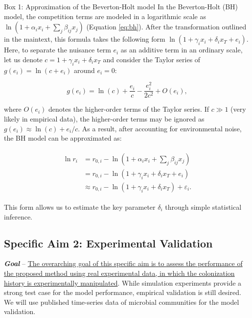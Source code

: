 \documentclass[12pt, class=article, crop=false]{standalone}
\begin{document}
\begin{tcolorbox}[{
  breakable,
  colback=white,
  colframe=gray,
  coltext=black,
  parbox=false,
  boxsep=5pt,
  arc=1pt}]
    Box 1: Approximation of the Beverton-Holt model
    \hline
    In the Beverton-Holt (BH) model, the competition terms are modeled in a logarithmic scale as $\ln(1 + \alpha_i x_i + \sum_j \beta_{ij} x_j)$ (Equation \ref{eq:bh}).
    After the transformation outlined in the maintext, this formula takes the following form $\ln(1 + \gamma_i x_i + \delta_i x_T + e_i)$.
    Here, to separate the nuisance term $e_i$ as an additive term in an ordinary scale, let us denote $c = 1 + \gamma_i x_i + \delta_i x_T$ and consider the Taylor series of $g(e_i) = \ln(c + e_i)$ around $e_i = 0$:

    \begin{equation}
        \label{eq:bhtaylor}
        g(e_i) = \ln(c) + \frac{e_i}{c} - \frac{e_i^2}{2 c^2} + O(e_i),
    \end{equation}

    where $O(e_i)$ denotes the higher-order terms of the Taylor series. If $c \gg 1$ (very likely in empirical data), the higher-order terms may be ignored as $g(e_i) \approx \ln(c) + e_i / c$.
    As a result, after accounting for environmental noise, the BH model can be approximated as:

    \begin{align}
    \begin{split}
        \ln r_i &= r_{0,i} - \ln(1 + \alpha_i x_i + \sum_j \beta_{ij} x_j)\\
                &= r_{0,i} - \ln(1 + \gamma_i x_i + \delta_{i} x_T + e_i)\\
                &\approx r_{0,i} - \ln(1 + \gamma_i x_i + \delta_i x_T) + \varepsilon_i.
    \end{split}
    \end{align}

    This form allows us to estimate the key parameter $\delta_i$ through simple statistical inference.
\end{tcolorbox}

\subsection*{Specific Aim 2: Experimental Validation}

\textbf{\textit{Goal}} -- 
\ul{The overarching goal of this specific aim is to assess the performance of the proposed method using real experimental data, in which the colonization history is experimentally manipulated}.
While simulation experiments provide a strong test case for the model performance, empirical validation is still desired.
We will use published time-series data of microbial communities for the model validation.
\end{document}

